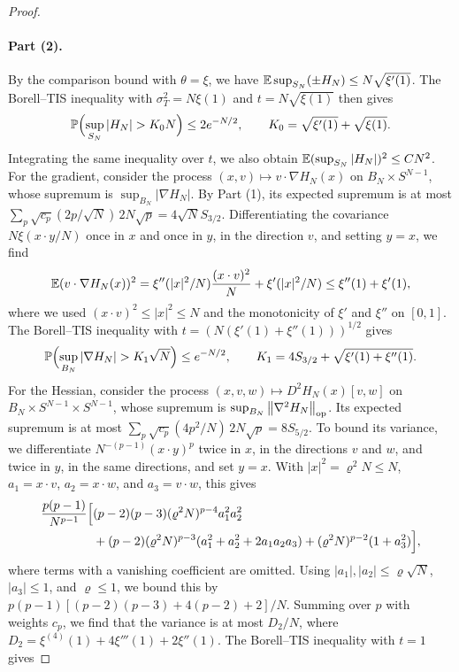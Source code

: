 \begin{proof}
\paragraph{Part (2).} By the comparison bound with $\theta=\xi$, we have $\mathbb E\sup_{S_N}(\pm H_N)\le N\sqrt{\xi'(1)}$. The Borell--TIS inequality with $\sigma_T^2=N\xi(1)$ and $t=N\sqrt{\xi(1)}$ then gives
\begin{equation*}
\Pp\Bigl(\sup_{S_N}|H_N|>K_0N\Bigr)\le2e^{-N/2},\qquad K_0=\sqrt{\xi'(1)}+\sqrt{\xi(1)}.
\end{equation*}
Integrating the same inequality over $t$, we also obtain $\mathbb E(\sup_{S_N}|H_N|)^2\le CN^2$. For the gradient, consider the process $(x,v)\mapsto v\cdot\nabla H_N(x)$ on $B_N\times S^{N-1}$, whose supremum is $\sup_{B_N}|\nabla H_N|$. By Part (1), its expected supremum is at most $\sum_p\sqrt{c_p}(2p/\sqrt N)\,2N\sqrt p=4\sqrt NS_{3/2}$. Differentiating the covariance $N\xi(x\cdot y/N)$ once in $x$ and once in $y$, in the direction $v$, and setting $y=x$, we find
\begin{equation*}
\mathbb E(v\cdot\nabla H_N(x))^2=\xi''(|x|^2/N)\frac{(x\cdot v)^2}N+\xi'(|x|^2/N)\le\xi''(1)+\xi'(1),
\end{equation*}
where we used $(x\cdot v)^2\le|x|^2\le N$ and the monotonicity of $\xi'$ and $\xi''$ on $[0,1]$. The Borell--TIS inequality with $t=(N(\xi'(1)+\xi''(1)))^{1/2}$ gives
\begin{equation*}
\Pp\Bigl(\sup_{B_N}|\nabla H_N|>K_1\sqrt N\Bigr)\le e^{-N/2},\qquad K_1=4S_{3/2}+\sqrt{\xi'(1)+\xi''(1)}.
\end{equation*}
For the Hessian, consider the process $(x,v,w)\mapsto D^2H_N(x)[v,w]$ on $B_N\times S^{N-1}\times S^{N-1}$, whose supremum is $\sup_{B_N}\left\lVert\nabla^2H_N\right\rVert_{\mathrm{op}}$. Its expected supremum is at most $\sum_p\sqrt{c_p}(4p^2/N)\,2N\sqrt p=8S_{5/2}$. To bound its variance, we differentiate $N^{-(p-1)}(x\cdot y)^p$ twice in $x$, in the directions $v$ and $w$, and twice in $y$, in the same directions, and set $y=x$. With $|x|^2=\varrho^2N\le N$, $a_1=x\cdot v$, $a_2=x\cdot w$, and $a_3=v\cdot w$, this gives
\begin{equation*}
\begin{split}
\frac{p(p-1)}{N^{p-1}}\Bigl[&(p-2)(p-3)(\varrho^2N)^{p-4}a_1^2a_2^2\\
&+(p-2)(\varrho^2N)^{p-3}(a_1^2+a_2^2+2a_1a_2a_3)+(\varrho^2N)^{p-2}(1+a_3^2)\Bigr],
\end{split}
\end{equation*}
where terms with a vanishing coefficient are omitted. Using $|a_1|,|a_2|\le\varrho\sqrt N$, $|a_3|\le1$, and $\varrho\le1$, we bound this by $p(p-1)[(p-2)(p-3)+4(p-2)+2]/N$. Summing over $p$ with weights $c_p$, we find that the variance is at most $D_2/N$, where $D_2=\xi^{(4)}(1)+4\xi'''(1)+2\xi''(1)$. The Borell--TIS inequality with $t=1$ gives

\end{proof}
